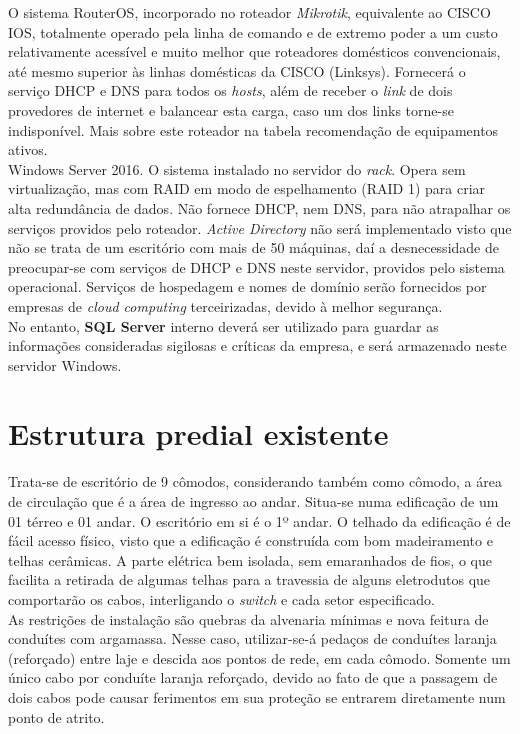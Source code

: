 \documentclass[	DIV=calc,%
							paper=a4,%
							fontsize=12pt,%
							onecolumn]{scrartcl}	 					%
\begin{document}
O sistema RouterOS, incorporado no roteador \textit{Mikrotik}, equivalente ao CISCO IOS, totalmente operado pela linha de comando e de extremo poder a um custo relativamente acessível e muito melhor que roteadores domésticos convencionais, até mesmo superior às linhas domésticas da CISCO (Linksys). Fornecerá o serviço DHCP e DNS para todos os \textit{hosts}, além de receber o \textit{link} de dois provedores de internet e balancear esta carga, caso um dos links torne-se indisponível. Mais sobre este roteador na tabela recomendação de equipamentos ativos.
\\

Windows Server 2016. O sistema instalado no servidor do \textit{rack}. Opera sem virtualização, mas com RAID em modo de espelhamento (RAID 1) para criar alta redundância de dados. Não fornece DHCP, nem DNS, para não atrapalhar os serviços providos pelo roteador. \textit{Active Directory }não será implementado visto que não se trata de um escritório com mais de 50 máquinas, daí a desnecessidade de preocupar-se com serviços de DHCP e DNS neste servidor, providos pelo sistema operacional. Serviços de hospedagem e nomes de domínio serão fornecidos por empresas de \textit{cloud computing} terceirizadas, devido à melhor segurança. 
\\

No entanto, \textbf{SQL Server} interno deverá ser utilizado para guardar as informações consideradas sigilosas e críticas da empresa, e será armazenado neste servidor Windows.


\section{Estrutura predial existente}

Trata-se de escritório de 9 cômodos, considerando também como cômodo, a área de circulação que é a área de ingresso ao andar. Situa-se numa edificação de um 01 térreo e 01 andar. O escritório em si é o 1º andar. O telhado da edificação é de fácil acesso físico, visto que a edificação é construída com bom madeiramento e telhas cerâmicas. A parte elétrica bem isolada, sem emaranhados de fios, o que facilita a retirada de algumas telhas para a travessia de alguns eletrodutos que comportarão os cabos, interligando o \textit{switch} e cada setor especificado. \\

As restrições de instalação são quebras da alvenaria mínimas e nova feitura de conduítes com argamassa. Nesse caso, utilizar-se-á pedaços de conduítes laranja (reforçado) entre laje e descida aos pontos de rede, em cada cômodo. Somente um único cabo por conduíte laranja reforçado, devido ao fato de que a passagem de dois cabos pode causar ferimentos em sua proteção se entrarem diretamente num ponto de atrito.
\\
\end{document}
